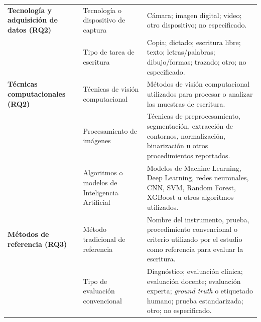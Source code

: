 \documentclass{iaesarticle}
\begin{document}
\begin{longtable}{%
    |>{\raggedright\arraybackslash}p{}%
    |>{\raggedright\arraybackslash}p{}%
    |>{\raggedright\arraybackslash}p{}|}
\textbf{Tecnología y adquisición de datos (RQ2)}
&
Tecnología o dispositivo de captura
&
Cámara; imagen digital; video; otro dispositivo; no especificado.
\\

\addlinespace[2mm]

&
Tipo de tarea de escritura
&
Copia; dictado; escritura libre; texto; letras/palabras; dibujo/formas; trazado; otro; no especificado.
\\

\hline


\textbf{Técnicas computacionales (RQ2)}
&
Técnicas de visión computacional
&
Métodos de visión computacional utilizados para procesar o analizar las muestras de escritura.
\\

\addlinespace[2mm]

&
Procesamiento de imágenes
&
Técnicas de preprocesamiento, segmentación, extracción de contornos, normalización, binarización u otros procedimientos reportados.
\\

\addlinespace[2mm]

&
Algoritmos o modelos de Inteligencia Artificial
&
Modelos de Machine Learning, Deep Learning, redes neuronales, CNN, SVM, Random Forest, XGBoost u otros algoritmos utilizados.
\\

\hline


\textbf{Métodos de referencia (RQ3)}
&
Método tradicional de referencia
&
Nombre del instrumento, prueba, procedimiento convencional o criterio utilizado por el estudio como referencia para evaluar la escritura.
\\

\addlinespace[2mm]

&
Tipo de evaluación convencional
&
Diagnóstico; evaluación clínica; evaluación docente; evaluación experta; \textit{ground truth} o etiquetado humano; prueba estandarizada; otro; no especificado.
\\

\hline



\end{longtable}
\end{document}
